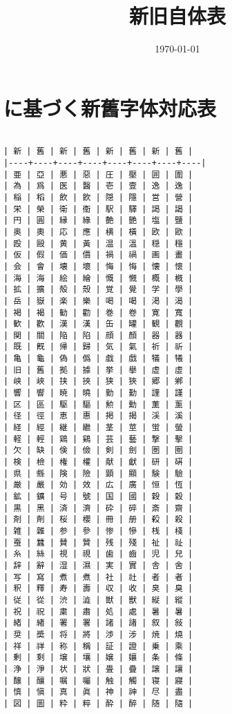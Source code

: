 \documentclass[11pt,a4j,titlepage]{jarticle}
\date{\today}
\title{新旧自体表}
\begin{document}
\maketitle


\section{に基づく新舊字体対応表}
\label{sec:orgbf68bce}

\begin{verbatim}

| 新 | 舊 | 新 | 舊 | 新 | 舊 | 新 | 舊 |
|----+----+----+----+----+----+----+----|
| 亜 | 亞 | 悪 | 惡 | 圧 | 壓 | 囲 | 圍 |
| 為 | 爲 | 医 | 醫 | 壱 | 壹 | 逸 | 逸 |
| 稲 | 稻 | 飲 | 飮 | 隠 | 隱 | 営 | 營 |
| 栄 | 榮 | 衛 | 衞 | 駅 | 驛 | 謁 | 謁 |
| 円 | 圓 | 縁 | 緣 | 艶 | 艷 | 塩 | 鹽 |
| 奥 | 奧 | 応 | 應 | 横 | 橫 | 欧 | 歐 |
| 殴 | 毆 | 黄 | 黃 | 温 | 溫 | 穏 | 穩 |
| 仮 | 假 | 価 | 價 | 禍 | 禍 | 画 | 畫 |
| 会 | 會 | 壊 | 壞 | 悔 | 悔 | 懐 | 懷 |
| 海 | 海 | 絵 | 繪 | 慨 | 慨 | 概 | 槪 |
| 拡 | 擴 | 殻 | 殼 | 覚 | 覺 | 学 | 學 |
| 岳 | 嶽 | 楽 | 樂 | 喝 | 喝 | 渇 | 渴 |
| 褐 | 褐 | 勧 | 勸 | 巻 | 卷 | 寛 | 寬 |
| 歓 | 歡 | 漢 | 漢 | 缶 | 罐 | 観 | 觀 |
| 関 | 關 | 陥 | 陷 | 顔 | 顏 | 器 | 器 |
| 既 | 既 | 帰 | 歸 | 気 | 氣 | 祈 | 祈 |
| 亀 | 龜 | 偽 | 僞 | 戯 | 戲 | 犠 | 犧 |
| 旧 | 舊 | 拠 | 據 | 挙 | 擧 | 虚 | 虛 |
| 峡 | 峽 | 挟 | 挾 | 狭 | 狹 | 郷 | 鄕 |
| 響 | 響 | 暁 | 曉 | 勤 | 勤 | 謹 | 謹 |
| 区 | 區 | 駆 | 驅 | 勲 | 勳 | 薫 | 薰 |
| 径 | 徑 | 恵 | 惠 | 掲 | 揭 | 渓 | 溪 |
| 経 | 經 | 継 | 繼 | 茎 | 莖 | 蛍 | 螢 |
| 軽 | 輕 | 鶏 | 鷄 | 芸 | 藝 | 撃 | 擊 |
| 欠 | 缺 | 倹 | 儉 | 剣 | 劍 | 圏 | 圈 |
| 検 | 檢 | 権 | 權 | 献 | 獻 | 研 | 硏 |
| 県 | 縣 | 険 | 險 | 顕 | 顯 | 験 | 驗 |
| 厳 | 嚴 | 効 | 效 | 広 | 廣 | 恒 | 恆 |
| 鉱 | 鑛 | 号 | 號 | 国 | 國 | 穀 | 穀 |
| 黒 | 黑 | 済 | 濟 | 砕 | 碎 | 斎 | 齋 |
| 剤 | 劑 | 桜 | 櫻 | 冊 | 册 | 殺 | 殺 |
| 雑 | 雜 | 参 | 參 | 惨 | 慘 | 桟 | 棧 |
| 蚕 | 蠶 | 賛 | 贊 | 残 | 殘 | 祉 | 祉 |
| 糸 | 絲 | 視 | 視 | 歯 | 齒 | 児 | 兒 |
| 辞 | 辭 | 湿 | 濕 | 実 | 實 | 舎 | 舍 |
| 写 | 寫 | 煮 | 煮 | 社 | 社 | 者 | 者 |
| 釈 | 釋 | 寿 | 壽 | 収 | 收 | 臭 | 臭 |
| 従 | 從 | 渋 | 澁 | 獣 | 獸 | 縦 | 縱 |
| 祝 | 祝 | 粛 | 肅 | 処 | 處 | 暑 | 暑 |
| 緒 | 緖 | 署 | 署 | 諸 | 諸 | 叙 | 敍 |
| 奨 | 奬 | 将 | 將 | 渉 | 涉 | 焼 | 燒 |
| 祥 | 祥 | 称 | 稱 | 証 | 證 | 乗 | 乘 |
| 剰 | 剩 | 壌 | 壤 | 嬢 | 孃 | 条 | 條 |
| 浄 | 淨 | 状 | 狀 | 畳 | 疊 | 譲 | 讓 |
| 醸 | 釀 | 嘱 | 囑 | 触 | 觸 | 寝 | 寢 |
| 慎 | 愼 | 真 | 眞 | 神 | 神 | 尽 | 盡 |
| 図 | 圖 | 粋 | 粹 | 酔 | 醉 | 随 | 隨 |

\end{verbatim}
\end{document}
